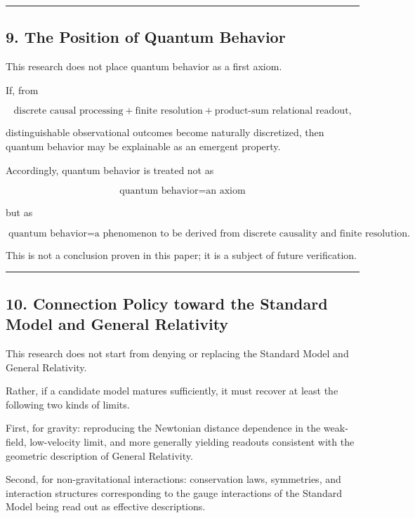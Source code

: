 \documentclass[
  a4paper,
]{article}
\begin{document}
\begin{center}\rule{0.5\linewidth}{0.5pt}\end{center}

\subsection{9. The Position of Quantum
Behavior}\label{the-position-of-quantum-behavior}

This research does not place quantum behavior as a first axiom.

If, from

\[
\boxed{
\text{discrete causal processing}
+
\text{finite resolution}
+
\text{product-sum relational readout,}
}
\]

distinguishable observational outcomes become naturally discretized,
then quantum behavior may be explainable as an emergent property.

Accordingly, quantum behavior is treated not as

\[
\boxed{
\text{quantum behavior}
=
\text{an axiom}
}
\]

but as

\[
\boxed{
\text{quantum behavior}
=
\text{a phenomenon to be derived from discrete causality and finite resolution.}
}
\]

This is not a conclusion proven in this paper; it is a subject of future
verification.

\begin{center}\rule{0.5\linewidth}{0.5pt}\end{center}

\subsection{10. Connection Policy toward the Standard Model and General
Relativity}\label{connection-policy-toward-the-standard-model-and-general-relativity}

This research does not start from denying or replacing the Standard
Model and General Relativity.

Rather, if a candidate model matures sufficiently, it must recover at
least the following two kinds of limits.

First, for gravity: reproducing the Newtonian distance dependence in the
weak-field, low-velocity limit, and more generally yielding readouts
consistent with the geometric description of General Relativity.

Second, for non-gravitational interactions: conservation laws,
symmetries, and interaction structures corresponding to the gauge
interactions of the Standard Model being read out as effective
descriptions.
\end{document}
